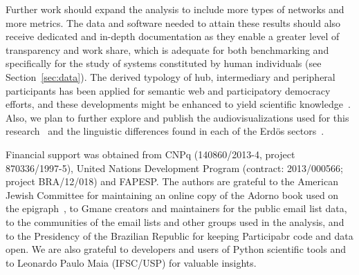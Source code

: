 \documentclass[%
aip,
jmp,%
amsmath,amssymb,
reprint,%
]{revtex4-1}
\begin{document}
Further work should expand the analysis to include
more types of networks and more metrics.
The data and software needed to attain these results
should also receive dedicated and in-depth
documentation as they enable a greater level of transparency
and work share,
which is adequate for both benchmarking
and specifically for the study of systems constituted
by human individuals (see Section~\ref{sec:data}).
The derived typology of hub, intermediary and peripheral participants
has been applied for semantic web and participatory democracy efforts,
and these developments might be enhanced to yield scientific knowledge~\cite{opa}.
Also, we plan to further explore and publish the audiovisualizations
used for this research~\cite{versinus,animacoes} and
the linguistic differences found in each of the Erd\"os sectors~\cite{rcText}.


% 
% 



\begin{acknowledgments}
Financial support was obtained from CNPq (140860/2013-4,
project 870336/1997-5), United Nations Development Program (contract: 2013/000566; project BRA/12/018) and FAPESP. 
The authors are grateful to the American Jewish Committee for maintaining an online copy of the Adorno book used on the epigraph~\cite{adorno}, to Gmane creators and maintainers for the public email list data, to the communities of the email lists and other groups used in the analysis, and to the Presidency of the Brazilian Republic for keeping Participabr code and data open.
We are also grateful to developers and users of Python scientific tools
and to Leonardo Paulo Maia (IFSC/USP) for valuable insights.
\end{acknowledgments}
\end{document}
